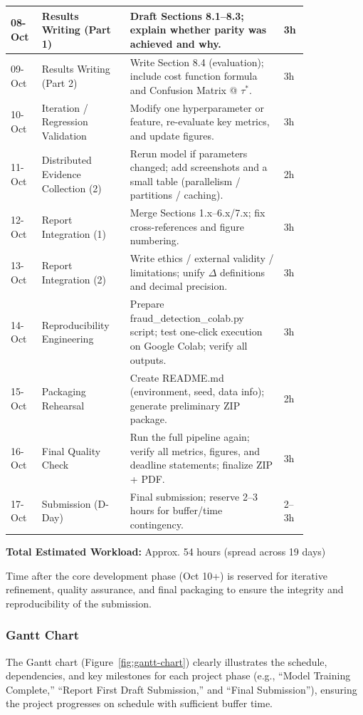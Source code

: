 \documentclass[sigplan,screen]{acmart}
\begin{document}
\begin{table}[h]
\begin{tabular}{|p{0.07\linewidth}|p{0.25\linewidth}|p{0.45\linewidth}|p{0.06\linewidth}|}
\hline
08-Oct & Results Writing (Part 1) & Draft Sections 8.1--8.3; explain whether parity was achieved and why. & 3h \\
\hline
09-Oct & Results Writing (Part 2) & Write Section 8.4 (evaluation); include cost function formula and Confusion Matrix @ $\tau^*$. & 3h \\
\hline
10-Oct & Iteration / Regression Validation & Modify one hyperparameter or feature, re-evaluate key metrics, and update figures. & 3h \\
\hline
11-Oct & Distributed Evidence Collection (2) & Rerun model if parameters changed; add screenshots and a small table (parallelism / partitions / caching). & 2h \\
\hline
12-Oct & Report Integration (1) & Merge Sections 1.x--6.x/7.x; fix cross-references and figure numbering. & 3h \\
\hline
13-Oct & Report Integration (2) & Write ethics / external validity / limitations; unify $\Delta$ definitions and decimal precision. & 3h \\
\hline
14-Oct & Reproducibility Engineering & Prepare fraud\_detection\_colab.py script; test one-click execution on Google Colab; verify all outputs. & 3h \\
\hline
15-Oct & Packaging Rehearsal & Create README.md (environment, seed, data info); generate preliminary ZIP package. & 2h \\
\hline
16-Oct & Final Quality Check & Run the full pipeline again; verify all metrics, figures, and deadline statements; finalize ZIP + PDF. & 3h \\
\hline
17-Oct & Submission (D-Day) & Final submission; reserve 2--3 hours for buffer/time contingency. & 2--3h \\
\hline
\end{tabular}
\end{table}

\textbf{Total Estimated Workload:} Approx. 54 hours (spread across 19 days)

Time after the core development phase (Oct 10+) is reserved for iterative refinement, quality assurance, and final packaging to ensure the integrity and reproducibility of the submission.

\subsubsection{Gantt Chart}

The Gantt chart (Figure~\ref{fig:gantt-chart}) clearly illustrates the schedule, dependencies, and key milestones for each project phase (e.g., ``Model Training Complete,'' ``Report First Draft Submission,'' and ``Final Submission''), ensuring the project progresses on schedule with sufficient buffer time.
\end{document}
